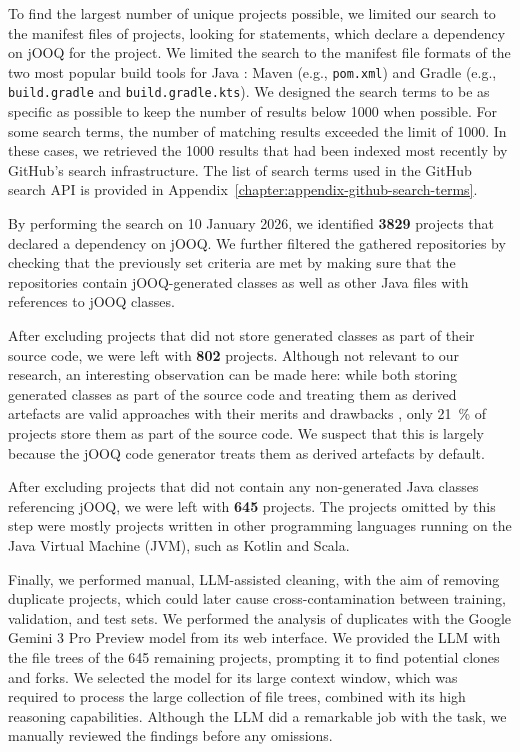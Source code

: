 To find the largest number of unique projects possible, we limited our search to the manifest files of projects, looking for statements, which declare a dependency on jOOQ for the project. We limited the search to the manifest file formats of the two most popular build tools for Java : Maven  (e.g., \texttt{pom.xml}) and Gradle  (e.g., \texttt{build.gradle} and \texttt{build.gradle.kts}). We designed the search terms to be as specific as possible to keep the number of results below \num{1000} when possible. For some search terms, the number of matching results exceeded the limit of \num{1000}. In these cases, we retrieved the \num{1000} results that had been indexed most recently by GitHub’s search infrastructure. The list of search terms used in the GitHub search API is provided in Appendix~\ref{chapter:appendix-github-search-terms}.

By performing the search on 10 January 2026, we identified \textbf{\num{3829}} projects that declared a dependency on jOOQ. We further filtered the gathered repositories by checking that the previously set criteria are met by making sure that the repositories contain jOOQ-generated classes as well as other Java files with references to jOOQ classes.

After excluding projects that did not store generated classes as part of their source code, we were left with \textbf{\num{802}} projects. Although not relevant to our research, an interesting observation can be made here: while both storing generated classes as part of the source code and treating them as derived artefacts are valid approaches with their merits and drawbacks , only \qty{21}{\percent} of projects store them as part of the source code. We suspect that this is largely because the jOOQ code generator treats them as derived artefacts by default.

After excluding projects that did not contain any non-generated Java classes referencing jOOQ, we were left with \textbf{\num{645}} projects. The projects omitted by this step were mostly projects written in other programming languages running on the Java Virtual Machine (JVM), such as Kotlin and Scala.

Finally, we performed manual, LLM-assisted cleaning, with the aim of removing duplicate projects, which could later cause cross-contamination between training, validation, and test sets. We performed the analysis of duplicates with the Google Gemini 3 Pro Preview  model from its web interface. We provided the LLM with the file trees of the \num{645} remaining projects, prompting it to find potential clones and forks. We selected the model for its large context window, which was required to process the large collection of file trees, combined with its high reasoning capabilities. Although the LLM did a remarkable job with the task, we manually reviewed the findings before any omissions.

